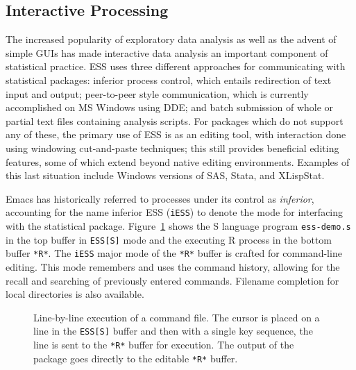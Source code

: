 \documentclass{article}
\newcommand{\stexttt}[1]{{\small\texttt{#1}}}
\begin{document}
\subsection{Interactive Processing}
\label{sec:interactive}

The increased popularity of exploratory data analysis as well as the
advent of simple GUIs has made interactive data analysis an important
component of statistical practice.  ESS uses three different
approaches for communicating with statistical packages: inferior
process control, which entails redirection of text input and output;
peer-to-peer style communication, which is currently accomplished on MS Windows
using DDE; and batch submission of whole or partial text files
containing analysis scripts.  For packages which do not support any of
these, the primary use of ESS is as an editing tool, with interaction
done using windowing cut-and-paste techniques; this still provides
beneficial editing features, some of which extend beyond native
editing environments.  Examples of this last situation include Windows
versions of SAS, Stata, and XLispStat.

Emacs has historically referred to processes under its control as
\textit{inferior}, accounting for the name inferior ESS
(\stexttt{iESS}) to denote the mode for interfacing with the
statistical package.  Figure~\ref{f.ess-demo} shows the S language
program \stexttt{ess-demo.s} in the top buffer in \stexttt{ESS[S]}
mode and the executing R process in the bottom buffer \stexttt{*R*}.
The \stexttt{iESS} major mode of the \stexttt{*R*} buffer is crafted
for command-line editing.  This mode remembers and uses the command
history, allowing for the recall and searching of previously entered
commands.  Filename completion for local directories is also
available.


\begin{figure}[tb]
  \caption{Line-by-line execution of a command file. The cursor is
    placed on a line in the \stexttt{ESS[S]} buffer and then with a
    single key sequence, the line is sent to the \stexttt{*R*} buffer
    for execution.  The output of the package goes directly to the
    editable \stexttt{*R*} buffer.}
  \label{f.ess-demo}
\end{figure}
\end{document}
